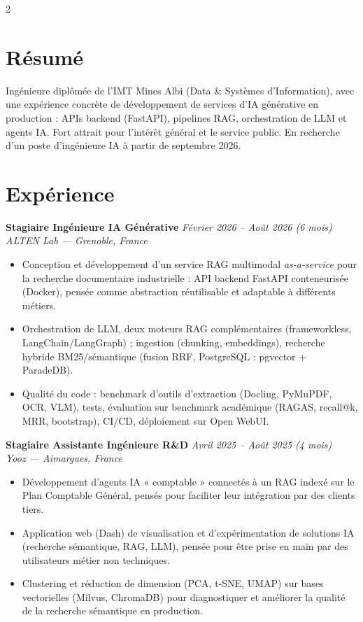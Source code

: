 \documentclass[10.5pt,a4paper]{article}
\newcommand{\sectionrule}{\vspace{-6pt}{\color{accent}\hrule height 1pt}\vspace{3pt}}
\newcommand{\cvexp}[5]{%
  \noindent\textbf{#1} \hfill {\itshape\color{graytext}\small #4}\\
  {\itshape #2 --- #3}\\[-6pt]
  #5
  \vspace{9pt}
}
\begin{document}
\setlength{\columnsep}{1.5em}
\begin{paracol}{2}

\section*{Résumé}
\sectionrule
\justifying
Ingénieure diplômée de l'IMT Mines Albi (Data \& Systèmes d'Information), avec une expérience concrète de développement de services d'IA générative en production : APIs backend (FastAPI), pipelines RAG, orchestration de LLM et agents IA. Fort attrait pour l'intérêt général et le service public. En recherche d'un poste d'ingénieure IA à partir de septembre 2026.

\section*{Expérience}
\sectionrule

\cvexp{Stagiaire Ingénieure IA Générative}{ALTEN Lab}{Grenoble, France}{Février 2026 -- Août 2026 (6 mois)}{%
  \begin{itemize}[leftmargin=12pt, itemsep=2pt, topsep=0pt, partopsep=0pt, parsep=0pt]
    \item Conception et développement d'un service RAG multimodal \emph{as-a-service} pour la recherche documentaire industrielle : API backend FastAPI conteneurisée (Docker), pensée comme abstraction réutilisable et adaptable à différents métiers.
    \item Orchestration de LLM, deux moteurs RAG complémentaires (frameworkless, LangChain/\allowbreak LangGraph) ; ingestion (chunking, embeddings), recherche hybride BM25/\allowbreak sémantique (fusion RRF, PostgreSQL : pgvector + ParadeDB).
    \item Qualité du code : benchmark d'outils d'extraction (Docling, PyMuPDF, OCR, VLM), tests, évaluation sur benchmark académique (RAGAS, recall@k, MRR, bootstrap), CI/CD, déploiement sur Open WebUI.
  \end{itemize}
}

\cvexp{Stagiaire Assistante Ingénieure R\&D}{Yooz}{Aimargues, France}{Avril 2025 -- Août 2025 (4 mois)}{%
  \begin{itemize}[leftmargin=12pt, itemsep=2pt, topsep=0pt, partopsep=0pt, parsep=0pt]
    \item Développement d'agents IA « comptable » connectés à un RAG indexé sur le Plan Comptable Général, pensés pour faciliter leur intégration par des clients tiers.
    \item Application web (Dash) de visualisation et d'expérimentation de solutions IA (recherche sémantique, RAG, LLM), pensée pour être prise en main par des utilisateurs métier non techniques.
    \item Clustering et réduction de dimension (PCA, t-SNE, UMAP) sur bases vectorielles (Milvus, ChromaDB) pour diagnostiquer et améliorer la qualité de la recherche sémantique en production.
  \end{itemize}
}


\end{paracol}
\end{document}
